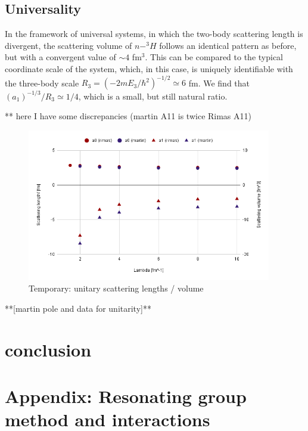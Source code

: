 \documentclass[aps,onecolumn,preprintnumbers,amsmath,amssymb,nofootinbib,superscriptaddress,notitlepage]{revtex4-1}
\begin{document}
\subsection*{Universality}

%
In the framework of universal systems, in which the two-body scattering length is divergent, the scattering volume of $n-^3H$ follows an identical pattern as before, but with a convergent value of $\sim4$ fm$^3$.
This can be compared to the typical coordinate scale of the system, which, in this case, is uniquely identifiable with the three-body scale $R_3=(-2mE_3/\hbar^2)^{-1/2}\simeq 6$ fm. 
We find that $(a_1)^{-1/3}/R_3 \simeq  1/4$, which is a small, but still natural ratio.

** here I have some discrepancies (martin A11 is twice Rimas A11)
\begin{figure}
\centering
\includegraphics[width=0.95\textwidth]{./Graphs/unitarityA} 
\caption{Temporary: unitary scattering lengths / volume}
\label{fig:Resonance_pole}
\end{figure}
**[martin pole and data for unitarity]**






\section{conclusion}







\section{Appendix: Resonating group method and interactions}
\end{document}
